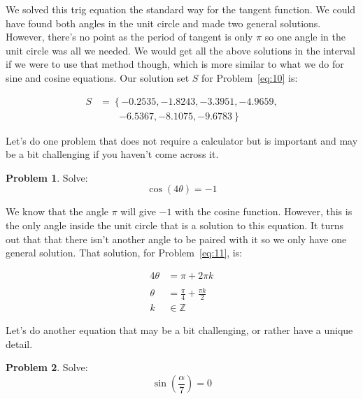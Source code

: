 \documentclass[12pt]{article}
\theoremstyle{definition}
\newtheorem{problem}{Problem}
\begin{document}
We solved this trig equation the standard way for the tangent function.
We could have found both angles in the unit circle and made two general solutions.
However, there's no point as the period of tangent is only $\pi$ so one angle in the unit circle was all we needed.
We would get all the above solutions in the interval if we were to use that method though, which is more similar to what we do for sine and cosine equations.
Our solution set $S$ for Problem~\eqref{eq:10} is:

\begin{equation}
    \begin{aligned}
        S & = \left\{-0.2535, -1.8243, -3.3951, -4.9659, \right. \\
          & \qquad \left. -6.5367, -8.1075, -9.6783 \right\}
    \end{aligned}
\end{equation}

Let's do one problem that does not require a calculator but is important and may be a bit challenging if you haven't come across it.

\begin{problem}
Solve:
\begin{equation*}
    \cos(4\theta) = -1 \label{eq:11}
\end{equation*}
\end{problem}

We know that the angle $\pi$ will give $-1$ with the cosine function.
However, this is the only angle inside the unit circle that is a solution to this equation.
It turns out that that there isn't another angle to be paired with it so we only have one general solution.
That solution, for Problem~\eqref{eq:11}, is:

\begin{align}
    4\theta & = \pi + 2\pi k                    \\
    \nonumber                                   \\
    \theta  & = \frac{\pi}{4} + \frac{\pi k}{2} \\
    k       & \in \mathbb{Z}
\end{align}

Let's do another equation that may be a bit challenging, or rather have a unique detail.

\begin{problem}
Solve:
\begin{equation*}
    \sin\left(\frac{\alpha}{7}\right) = 0 \label{eq:12}
\end{equation*}
\end{problem}
\end{document}
